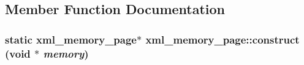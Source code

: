 \subsection{Member Function Documentation}
\hypertarget{structxml__memory__page_ab425973f2abb4fa98ff077d88c0df11c}{
\subsubsection[{construct}]{\setlength{\rightskip}{0pt plus 5cm}static {\bf xml\_\-memory\_\-page}$\ast$ xml\_\-memory\_\-page::construct (void $\ast$ {\em memory})}}
\label{structxml__memory__page_ab425973f2abb4fa98ff077d88c0df11c}


